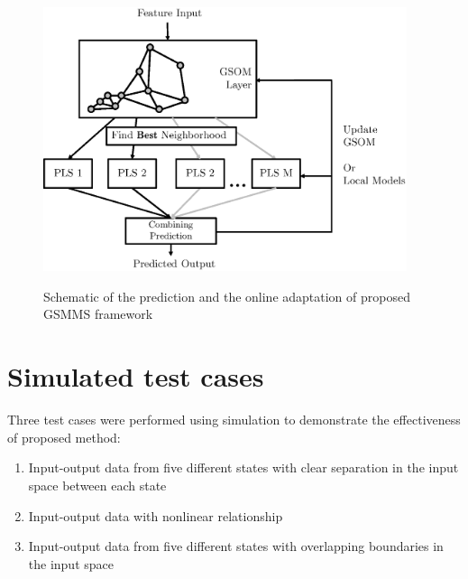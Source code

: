 \documentclass[review,3p]{elsarticle}
\renewcommand\[{\begin{equation}}
\renewcommand\]{\end{equation}}
\begin{document}
\begin{figure}[!htpb]
  \centering
  \includegraphics[width=0.95\textwidth]{figures/gsmms/gsmms_prediction.eps}\\
  \caption{Schematic of the prediction and the online adaptation of proposed GSMMS framework}\label{fig:gsmms_prediction}
\end{figure}

\clearpage
\section{Simulated test cases}
Three test cases were performed using simulation to demonstrate the
effectiveness of proposed method:
\begin{enumerate}
\item Input-output data from five different states with clear separation in the input space between each state
\item Input-output data with nonlinear relationship
\item Input-output data from five different states with overlapping boundaries in the input space
\end{enumerate}
\end{document}
